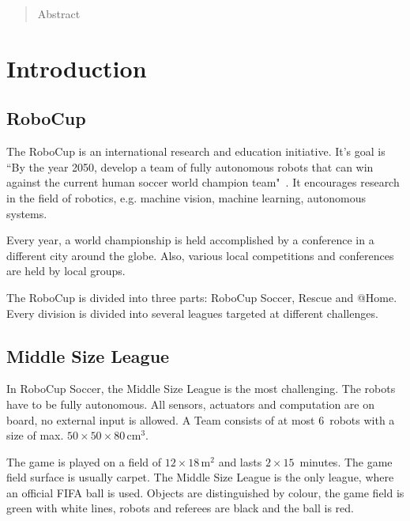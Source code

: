 \documentclass[12pt,a4paper]{article}
\newcommand{\MSL}{Middle Size League\xspace}
\begin{document}


\tableofcontents
\clearpage
\pagestyle{plain}



\begin{abstract}
Abstract

\end{abstract}

\clearpage

\section{Introduction}


\subsection{RoboCup}

The RoboCup is an international research and education initiative. 
It's goal is ``By the year 2050, develop a team of fully autonomous robots that can win against the current human soccer world champion team"~\cite{robocup.org}.
It encourages research in the field of robotics, e.g. machine vision, machine learning, autonomous systems.


Every year, a world championship is held accomplished by a conference in a different city around the globe.
Also, various local competitions and conferences are held by local groups.

The RoboCup is divided into three parts: RoboCup Soccer, Rescue and @Home.
Every division is divided into several leagues targeted at different challenges.


\subsection{\MSL}

In RoboCup Soccer, the \MSL is the most challenging.
The robots have to be fully autonomous.
All sensors, actuators and computation are on board, no external input is allowed.
A Team consists of at most 6~robots with a size of max. $50\times50\times80$\,cm$^3$.

The game is played on a field of $12\times18$\,m$^2$ and lasts $2\times15$~minutes.
The game field surface is usually carpet.
The \MSL is the only league, where an official FIFA ball is used.
Objects are distinguished by colour, the game field is green with white lines, robots and referees are black and the ball is red.
\end{document}
